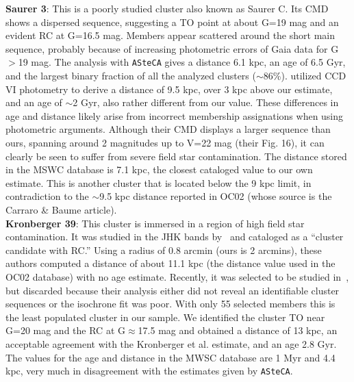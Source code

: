 \documentclass{aa}
\begin{document}
\begin{appendix}
  \noindent \textbf{Saurer 3}: This is a poorly studied cluster also known as Saurer C.
  Its CMD shows a dispersed sequence, suggesting a TO point at about G=19 mag
  and an evident RC at G=16.5 mag. Members appear scattered around the short
  main sequence, probably because of increasing photometric errors of Gaia data
  for G$>$19 mag.
  The analysis with \texttt{ASteCA} gives a distance 6.1 kpc, an age of 6.5
  Gyr, and the largest binary fraction of all the analyzed clusters 
  ($\sim$86\%).
  \cite{Carraro_2003} utilized CCD VI photometry to derive a distance of 9.5
  kpc, over 3 kpc above our estimate, and an age of $\sim$2 Gyr, also rather
  different from our value. These differences in age and distance likely
  arise from incorrect membership assignations when using photometric
  arguments. Although their CMD displays a larger sequence than
  ours, spanning around 2 magnitudes up to V=22 mag (their Fig. 16), it can
  clearly be seen to suffer from severe field star contamination.
  The distance stored in the MSWC database is 7.1 kpc, the closest cataloged
  value to our own estimate. This is another cluster that is located below the 9
  kpc limit, in contradiction to the $\sim$9.5 kpc distance reported in
  OC02 (whose source is the Carraro \& Baume article).\\

  \noindent \textbf{Kronberger 39}: This cluster is immersed in a region of high field
  star contamination. It was studied in the JHK bands by~\cite{Kronberger_2006}
  and cataloged as a {``cluster candidate with RC.''} Using a radius of 0.8
  arcmin (ours is 2 arcmins), these authors computed a distance of about 11.1
  kpc (the distance value used in the OC02 database) with no age estimate.
  Recently, it was selected to be studied in~\cite{Monteiro_2020}, but
  discarded because their analysis either did not reveal an identifiable cluster
  sequences or the isochrone fit was poor.
  With only 55 selected members this is the least populated cluster in our
  sample. We identified the cluster TO near G=20 mag and the RC at
  G$\approx$17.5 mag and obtained a distance of 13 kpc, an acceptable
  agreement with the Kronberger et al. estimate, and an age 2.8 Gyr.
  The values for the age and distance in the MWSC database are 1 Myr and 4.4
  kpc, very much in disagreement with the estimates given by \texttt{ASteCA}.\\


\end{appendix}
\end{document}
